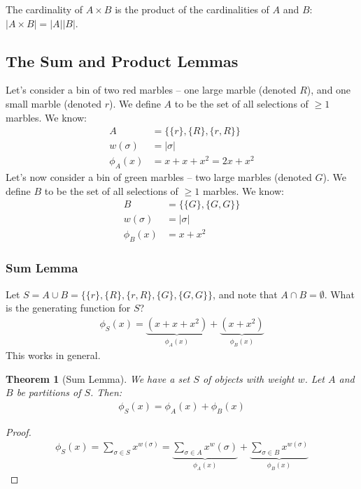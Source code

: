 \documentclass[]{article}
\newtheorem{theorem}{Theorem}[section]
\theoremstyle{definition}
\newcommand{\union}{\cup}
\newcommand{\intersection}{\cap}
\begin{document}
				The cardinality of $A \times B$ is the product of the cardinalities of $A$ and $B$: $|A \times B| = |A||B|$.
		\subsection{The Sum and Product Lemmas}
			Let's consider a bin of two red marbles -- one large marble (denoted $R$), and one small marble (denoted $r$). We define $A$ to be the set of all selections of $\ge 1$ marbles. We know: 
			\begin{align*}
				A &= \{ \{r\}, \{R\}, \{r, R\} \} \\
				w(\sigma) &= |\sigma| \\
				\phi_A(x) &= x + x + x^2 = 2x + x^2
			\end{align*}
			Let's now consider a bin of green marbles -- two large marbles (denoted $G$). We define $B$ to be the set of all selections of $\ge 1$ marbles. We know:
			\begin{align*}
				B &= \{ \{G\}, \{G, G\} \} \\
				w(\sigma) &= |\sigma| \\
				\phi_B(x) &= x + x^2
			\end{align*}
			\subsubsection{Sum Lemma}
				Let $S = A \union B = \{ \{r\}, \{R\}, \{r, R\}, \{G\}, \{G, G\} \}$, and note that $A \intersection B = \emptyset$. What is the generating function for $S$?
				\begin{align*}
					\phi_S(x) = \underbrace{(x + x + x^2)}_{\phi_A(x)} + \underbrace{(x  + x^2)}_{\phi_B(x)}
				\end{align*}
				This works in general.
				
				\begin{theorem}[Sum Lemma]
					We have a set $S$ of objects with weight $w$. Let $A$ and $B$ be partitions of $S$. Then:
					\begin{align*}
						\phi_S(x) = \phi_A(x) + \phi_B(x)
					\end{align*}
				\end{theorem}

				\begin{proof}
					\begin{align*}
						\phi_S(x) = \sum_{\sigma \in S} x^{w(\sigma)} = \underbrace{\sum_{\sigma \in A} x^w(\sigma)}_{\phi_A(x)} + \underbrace{\sum_{\sigma \in B} x^{w(\sigma)}}_{\phi_B(x)}
					\end{align*}
				\end{proof}
\end{document}
